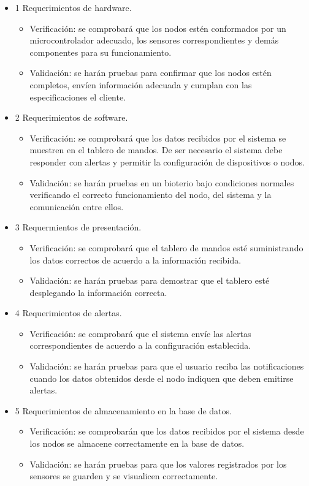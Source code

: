 \documentclass[
11pt, %
]{charter}
\begin{document}
\begin{itemize} 
\item 1 Requerimientos de hardware.
\begin{itemize}
	\item Verificación: se comprobará que los nodos estén conformados por un microcontrolador adecuado, los sensores correspondientes y demás componentes para su funcionamiento.
	\item Validación: se harán pruebas para confirmar que los nodos estén completos, envíen información adecuada y cumplan con las especificaciones el cliente.
\end{itemize}

\item 2 Requerimientos de software.
\begin{itemize}
	\item Verificación: se comprobará que los datos recibidos por el sistema se muestren en el tablero de mandos. De ser necesario el sistema debe responder con alertas y permitir la configuración de dispositivos o nodos.
	\item Validación: se harán pruebas en un bioterio bajo condiciones normales verificando el correcto funcionamiento del nodo, del sistema y la comunicación entre ellos.
\end{itemize}

\item 3 Requermientos de presentación.
\begin{itemize}
	\item Verificación: se comprobará que el tablero de mandos esté suministrando los datos correctos de acuerdo a la información recibida.
	\item Validación: se harán pruebas para demostrar que el tablero esté desplegando la información correcta.
\end{itemize}

\item 4 Requerimientos de alertas.
\begin{itemize}
	\item Verificación: se comprobará que el sistema envíe las alertas correspondientes de acuerdo a la configuración establecida.
	\item Validación: se harán pruebas para que el usuario reciba las notificaciones cuando los datos obtenidos desde el nodo indiquen que deben emitirse alertas.
\end{itemize}

\item 5 Requerimientos de almacenamiento en la base de datos.
\begin{itemize}
	\item Verificación: se comprobarán que los datos recibidos por el sistema desde los nodos se almacene correctamente en la base de datos.
	\item Validación: se harán pruebas para que los valores registrados por los sensores se guarden y se visualicen correctamente.
\end{itemize}

\end{itemize}
\end{document}
